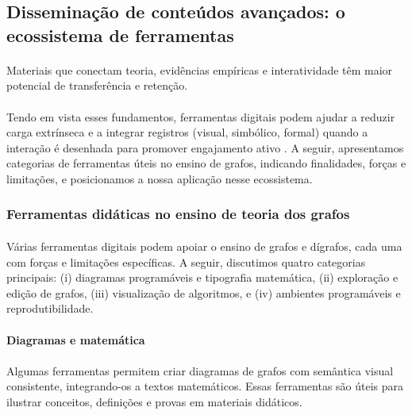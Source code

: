 \documentclass[12pt,a4paper]{article}
\def\emph#1{#1}%
\begin{document}
\subsection{Disseminação de conteúdos avançados: o ecossistema de ferramentas}

\paragraph{}
Materiais que conectam teoria, evidências empíricas e interatividade têm maior potencial de transferência e retenção.

\paragraph{}
Tendo em vista esses fundamentos, ferramentas digitais podem ajudar a reduzir carga extrínseca e a integrar registros (visual, simbólico, formal) quando a interação é desenhada para promover \emph{engajamento ativo} \cite{mayer2009multimedia,sweller1988cognitive,hundhausen2002meta,naps2003engagement}. A seguir, apresentamos categorias de ferramentas úteis no ensino de grafos, indicando finalidades, forças e limitações, e posicionamos a nossa aplicação nesse ecossistema.

\subsubsection{Ferramentas didáticas no ensino de teoria dos grafos}
\paragraph{}
Várias ferramentas digitais podem apoiar o ensino de grafos e dígrafos, cada uma com forças e limitações específicas. A seguir, discutimos quatro categorias principais: (i) diagramas programáveis e tipografia matemática, (ii) exploração e edição de grafos, (iii) visualização de algoritmos, e (iv) ambientes programáveis e reprodutibilidade.

\paragraph{Diagramas e matemática}
\paragraph{}
Algumas ferramentas permitem criar diagramas de grafos com semântica visual consistente, integrando-os a textos matemáticos. Essas ferramentas são úteis para ilustrar conceitos, definições e provas em materiais didáticos.
\end{document}
